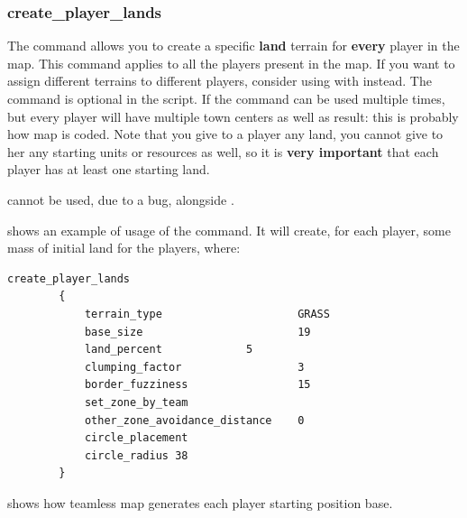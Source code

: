     \subsubsection{create\_player\_lands}

    The command allows you to create a specific \textbf{land} terrain for \textbf{every} player in the map. This command applies to all the players present in the map. If you want to assign different terrains to different players, consider using  with  instead. The command is optional in the script. If the command can be used multiple times, but every player will have multiple town centers as well as result: this is probably how map  is coded. Note that you give to a player any land, you cannot give to her any starting units or resources as well, so it is \textbf{very important} that each player has at least one starting land.

    \begin{attention}
         cannot be used, due to a bug, alongside .
    \end{attention}

      shows an example of usage of the command. It will create, for each player, some mass of initial land for the players, where\cite{forgotten-empires:rms-features}:

    \begin{lstlisting}[language=rms,label={lst:create-land-player},caption={Example of usage of \term{create\_player\_lands} in Team Arean by vierklee.}]
        create_player_lands 
        { 
            terrain_type                     GRASS 
            base_size                        19
            land_percent			 5
            clumping_factor                  3
            border_fuzziness                 15
            set_zone_by_team
            other_zone_avoidance_distance    0
            circle_placement
            circle_radius 38
        }
    \end{lstlisting}

     shows how teamless map generates each player starting position base.

